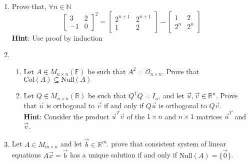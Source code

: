\documentclass{report}
\newcommand{\N}{{\mathbb{N}}}
\newcommand{\R}{{\mathbb{R}}}
\newcommand{\F}{{\mathbb{F}}}
\begin{document}
\begin{enumerate}
    \item Prove that, $\forall n \in \N$ 
    $$\begin{bmatrix} 3 & 2\\ -1 & 0 \end{bmatrix}^2 = \begin{bmatrix} 2^{n + 1} & 2^{n + 1}\\ 1 & 2 \end{bmatrix} - \begin{bmatrix} 1 & 2\\ 2^n & 2^n \end{bmatrix}$$
    \textbf{Hint}: Use proof by induction
    \item \begin{enumerate}
        \item Let $A \in M_{n \times n}(\F)$ be such that $A^2 = \mathcal{O}_{n \times n}$. Prove that $\text{Col}(A) \subseteq \text{Null}(A)$
        \item Let $Q \in M_{n \times n}(\R)$ be such that $Q^TQ = I_n$, and let $\vec{u}, \vec{v} \in \R^n$. Prove that $\vec{u}$ is orthogonal to $\vec{v}$ if and only if $Q\vec{u}$ is orthogonal to $Q\vec{v}$. \\
    \textbf{Hint}: Consider the product $\vec{u}^T\vec{v}$ of the $1 \times n$ and $n \times 1$ matrices $\vec{u}^T$ and $\vec{v}$.
    \end{enumerate}
    \item Let $A \in M_{m \times n}$ and let $\vec{b} \in \R^m$. prove that consistent system of linear equations $A\vec{x} = \vec{b}$ has a unique solution if and only if $\text{Null}(A) = \{\vec{0}\}$.
\end{enumerate}
\end{document}
